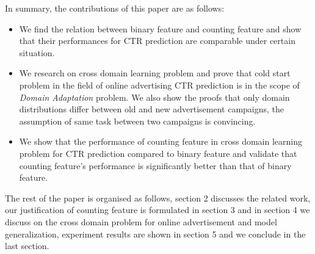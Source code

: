 In summary, the contributions of this paper are as follows:
\begin{itemize}
\item We find the relation between binary feature and counting feature and show that their performances for CTR prediction are comparable under certain situation.
\item We research on cross domain learning problem and prove that cold start problem in the field of online advertising CTR prediction is in the scope of \textit{Domain Adaptation} problem. We also show the proofs that only domain distributions differ between old and new advertisement campaigns, the assumption of same task between two campaigns is convincing. 
\item We show that the performance of counting feature in cross domain learning problem for CTR prediction compared to binary feature and validate that counting feature's performance is significantly better than that of binary feature.
\end{itemize}
The rest of the paper is organised as follows, section 2 discusses the related work, our justification of counting feature is formulated in section 3 and in section 4 we discuss on the cross domain problem for online advertisement and model generalization, experiment results are shown in section 5 and we conclude in the last section.



